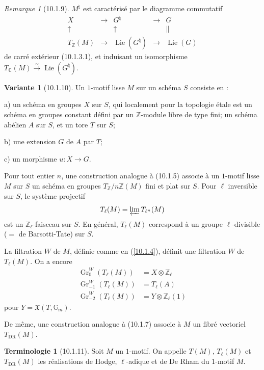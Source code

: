 \documentclass[12pt,a4paper]{amsart}
\theoremstyle{plain}
\theoremstyle{definition}
\newtheorem{terminologie}[lemme]{Terminologie}
\newtheorem{variante}[lemme]{Variante}
\theoremstyle{remark}
\newtheorem{remarque}[lemme]{Remarque}
\DeclareMathOperator{\Lie}{Lie}
\DeclareMathOperator{\Gr}{Gr}
\numberwithin{equation}{section}
\begin{document}
\begin{remarque}[10.1.9]\label{rem:10.1.9}
$M^\natural$ est caractérisé par le diagramme commutatif
\[
\begin{array}{ccccc}
X & \longrightarrow & G^\natural & \longrightarrow & G \\
\uparrow & & \uparrow & & \| \\
T_\mathbb{Z}(M) & \longrightarrow & \Lie(G^\natural) & \longrightarrow & \Lie(G)
\end{array}
\]
de carré extérieur (10.1.3.1), et induisant un isomorphisme $T_\mathbb{C}(M)\xrightarrow{\sim}\Lie(G^\natural)$.
\end{remarque}

\begin{variante}[10.1.10]\label{var:10.1.10}
Un $1$-motif lisse $M$ sur un schéma $S$ consiste en :

a) un schéma en groupes $X$ sur $S$, qui localement pour la topologie étale est un schéma en groupes constant défini par un $\mathbb{Z}$-module libre de type fini; un schéma abélien $A$ sur $S$, et un tore $T$ sur $S$;

b) une extension $G$ de $A$ par $T$;

c) un morphisme $u:X\to G$.
\end{variante}

Pour tout entier $n$, une construction analogue à (10.1.5) associe à un $1$-motif lisse $M$ sur $S$ un schéma en groupes $T_\mathbb{Z}/n\mathbb{Z}(M)$ fini et plat sur $S$. Pour $\ell$ inversible sur $S$, le système projectif
\[
T_\ell(M) = \varprojlim T_{\ell^n}(M)
\]
est un $\mathbb{Z}_\ell$-faisceau sur $S$. En général, $T_\ell(M)$ correspond à un groupe $\ell$-divisible ($=$ de Barsotti-Tate) sur $S$.

La filtration $W$ de $M$, définie comme en (\ref{10.1.4}), définit une filtration $W$ de $T_\ell(M)$. On a encore
\begin{align*}
\Gr_0^W(T_\ell(M)) &= X\otimes\mathbb{Z}_\ell \\
\Gr_{-1}^W(T_\ell(M)) &= T_\ell(A) \\
\Gr_{-2}^W(T_\ell(M)) &= Y\otimes\mathbb{Z}_\ell(1)
\end{align*}
pour $Y=\mathfrak{X}(T,\mathbb{G}_m)$.

De même, une construction analogue à (10.1.7) associe à $M$ un fibré vectoriel $T_\mathrm{DR}(M)$.

\begin{terminologie}[10.1.11]\label{term:10.1.11}
Soit $M$ un $1$-motif. On appelle $T(M)$, $T_\ell(M)$ et $T_\mathrm{DR}(M)$ les réalisations de Hodge, $\ell$-adique et de De Rham du $1$-motif $M$.
\end{terminologie}
\end{document}
